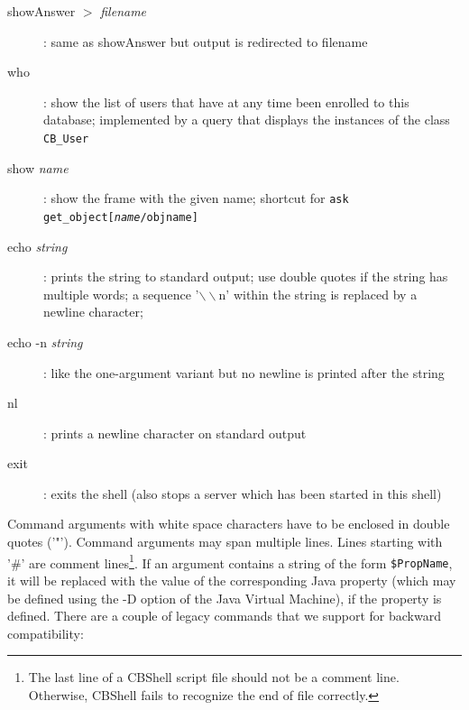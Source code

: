 \begin{description}
\item[showAnswer $>$ {\it filename}] :
      same as showAnswer but output is redirected to filename

\item[who] :
      show the list of users that have at any time been enrolled to this database;
      implemented by a query that displays the instances of the class {\tt CB\_User}

\item[show {\it name}] :
      show the frame with the given name; shortcut for
      {\tt ask get\_object[{\it name}/objname]}

\item[echo {\it string}] :
      prints the string to standard output; use double quotes if the string has multiple words;
      a sequence '$\backslash\backslash$n' within the string is replaced by a newline character; 

\item[echo -n {\it string}] :
      like the one-argument variant but no newline is printed after the string

\item[nl] :
      prints a newline character on standard output

\item[exit] :
      exits the shell (also stops a server which has been started in this shell)


\end{description}





Command arguments with white space characters have to be enclosed in double quotes ('"').
Command arguments may span multiple lines. Lines starting with '\#' are comment lines\footnote{
The last line of a CBShell script file should not be a comment line.
Otherwise, CBShell fails to recognize the end of file correctly.}.
If an argument contains a string of the form {\tt \$PropName}, it will be replaced with
the value of the corresponding Java property (which may be defined using the -D option
of the Java Virtual Machine), if the property is defined.
There are a couple of legacy commands that we support for backward compatibility:

